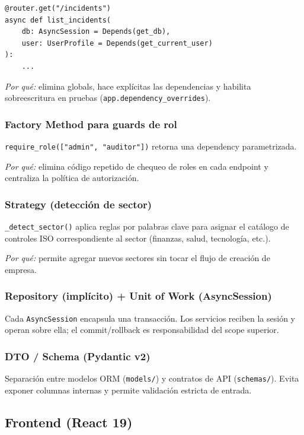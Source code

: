 \documentclass[12pt,a4paper,oneside]{article}
\begin{document}
\begin{verbatim}
@router.get("/incidents")
async def list_incidents(
    db: AsyncSession = Depends(get_db),
    user: UserProfile = Depends(get_current_user)
):
    ...
\end{verbatim}

\textit{Por qué:} elimina globals, hace explícitas las dependencias y habilita sobreescritura en pruebas (\texttt{app.dependency\_overrides}).

\subsubsection{Factory Method para guards de rol}
\texttt{require\_role(["admin", "auditor"])} retorna una dependency parametrizada.

\textit{Por qué:} elimina código repetido de chequeo de roles en cada endpoint y centraliza la política de autorización.

\subsubsection{Strategy (detección de sector)}
\texttt{\_detect\_sector()} aplica reglas por palabras clave para asignar el catálogo de controles ISO correspondiente al sector (finanzas, salud, tecnología, etc.).

\textit{Por qué:} permite agregar nuevos sectores sin tocar el flujo de creación de empresa.

\subsubsection{Repository (implícito) + Unit of Work (AsyncSession)}
Cada \texttt{AsyncSession} encapsula una transacción. Los servicios reciben la sesión y operan sobre ella; el commit/rollback es responsabilidad del scope superior.

\subsubsection{DTO / Schema (Pydantic v2)}
Separación entre modelos ORM (\texttt{models/}) y contratos de API (\texttt{schemas/}). Evita exponer columnas internas y permite validación estricta de entrada.

\subsection{Frontend (React 19)}
\end{document}
